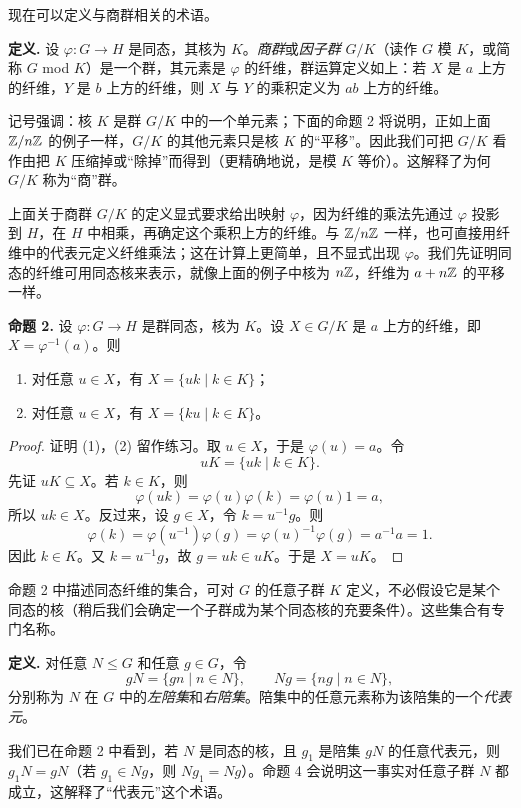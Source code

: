 现在可以定义与商群相关的术语。

\noindent\textbf{定义.} 设 $\varphi:G\to H$ 是同态，其核为 $K$。\emph{商群}或\emph{因子群} $G/K$（读作 $G$ 模 $K$，或简称 $G$ mod $K$）是一个群，其元素是 $\varphi$ 的纤维，群运算定义如上：若 $X$ 是 $a$ 上方的纤维，$Y$ 是 $b$ 上方的纤维，则 $X$ 与 $Y$ 的乘积定义为 $ab$ 上方的纤维。

记号强调：核 $K$ 是群 $G/K$ 中的一个单元素；下面的命题 2 将说明，正如上面 $\mathbb{Z}/n\mathbb{Z}$ 的例子一样，$G/K$ 的其他元素只是核 $K$ 的“平移”。因此我们可把 $G/K$ 看作由把 $K$ 压缩掉或“除掉”而得到（更精确地说，是模 $K$ 等价）。这解释了为何 $G/K$ 称为“商”群。

上面关于商群 $G/K$ 的定义显式要求给出映射 $\varphi$，因为纤维的乘法先通过 $\varphi$ 投影到 $H$，在 $H$ 中相乘，再确定这个乘积上方的纤维。与 $\mathbb{Z}/n\mathbb{Z}$ 一样，也可直接用纤维中的代表元定义纤维乘法；这在计算上更简单，且不显式出现 $\varphi$。我们先证明同态的纤维可用同态核来表示，就像上面的例子中核为 $n\mathbb{Z}$，纤维为 $a+n\mathbb{Z}$ 的平移一样。

\medskip
\noindent\textbf{命题 2.} 设 $\varphi:G\to H$ 是群同态，核为 $K$。设 $X\in G/K$ 是 $a$ 上方的纤维，即 $X=\varphi^{-1}(a)$。则
\begin{enumerate}[label=(\arabic*)]
  \item 对任意 $u\in X$，有 $X=\{uk\mid k\in K\}$；
  \item 对任意 $u\in X$，有 $X=\{ku\mid k\in K\}$。
\end{enumerate}

\begin{proof}
证明 (1)，(2) 留作练习。取 $u\in X$，于是 $\varphi(u)=a$。令
\[
  uK=\{uk\mid k\in K\}.
\]
先证 $uK\subseteq X$。若 $k\in K$，则
\[
  \varphi(uk)=\varphi(u)\varphi(k)=\varphi(u)1=a,
\]
所以 $uk\in X$。反过来，设 $g\in X$，令 $k=u^{-1}g$。则
\[
  \varphi(k)=\varphi(u^{-1})\varphi(g)=\varphi(u)^{-1}\varphi(g)=a^{-1}a=1.
\]
因此 $k\in K$。又 $k=u^{-1}g$，故 $g=uk\in uK$。于是 $X=uK$。
\end{proof}

命题 2 中描述同态纤维的集合，可对 $G$ 的任意子群 $K$ 定义，不必假设它是某个同态的核（稍后我们会确定一个子群成为某个同态核的充要条件）。这些集合有专门名称。

\noindent\textbf{定义.} 对任意 $N\leq G$ 和任意 $g\in G$，令
\[
  gN=\{gn\mid n\in N\},\qquad Ng=\{ng\mid n\in N\},
\]
分别称为 $N$ 在 $G$ 中的\emph{左陪集}和\emph{右陪集}。陪集中的任意元素称为该陪集的一个\emph{代表元}。

我们已在命题 2 中看到，若 $N$ 是同态的核，且 $g_1$ 是陪集 $gN$ 的任意代表元，则 $g_1N=gN$（若 $g_1\in Ng$，则 $Ng_1=Ng$）。命题 4 会说明这一事实对任意子群 $N$ 都成立，这解释了“代表元”这个术语。

